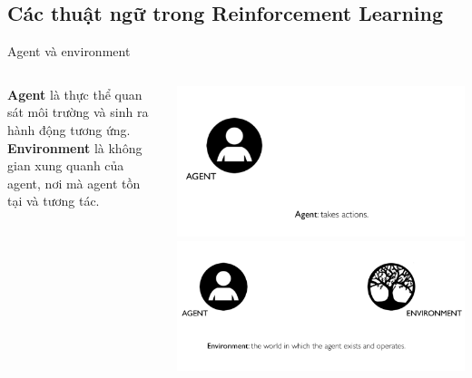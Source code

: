 \documentclass[10pt,aspectratio=169]{beamer}
\begin{document}
\subsection{Các thuật ngữ trong Reinforcement Learning}

\begin{frame}{Agent và environment}{\subsecname}
\begin{columns}
\begin{column}{0.4\textwidth}
\textbf{Agent} là thực thể quan sát môi trường và sinh ra hành động tương ứng.\\
\vspace{48pt}
\textbf{Environment} là không gian xung quanh của agent, nơi mà agent tồn tại và tương tác.\\
\end{column}
\begin{column}{0.5\textwidth}
\includegraphics[width=\textwidth]{source/1.png}\\
\includegraphics[width=\textwidth]{source/2.png}\\
\end{column}
\end{columns}
\end{frame}
\end{document}

